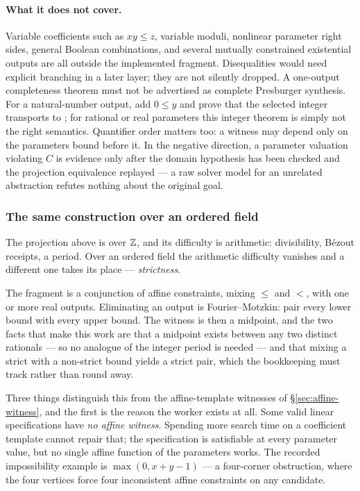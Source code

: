 \paragraph{What it does not cover.} Variable coefficients such as $xy\le z$,
variable moduli, nonlinear parameter right sides, general Boolean combinations,
and several mutually constrained existential outputs are all outside the
implemented fragment. Disequalities would need explicit branching in a later
layer; they are not silently dropped. A one-output completeness theorem must not
be advertised as complete Presburger synthesis. For a natural-number output,
add $0\le y$ and prove that the selected integer transports to ; for
rational or real parameters this integer theorem is simply not the right
semantics. Quantifier order matters too: a witness may depend only on the
parameters bound before it. In the negative direction, a parameter valuation
violating $C$ is evidence only after the domain hypothesis has been checked and
the projection equivalence replayed --- a raw solver model for an unrelated
abstraction refutes nothing about the original goal.

\subsubsection*{The same construction over an ordered field}

The projection above is over $\mathbb{Z}$, and its difficulty is arithmetic:
divisibility, B\'ezout receipts, a period. Over an ordered field the arithmetic
difficulty vanishes and a different one takes its place --- \emph{strictness}.

The fragment is a conjunction of affine constraints, mixing $\le$ and $<$, with
one or more real outputs. Eliminating an output is Fourier--Motzkin: pair every
lower bound with every upper bound. The witness is then a midpoint, and the two
facts that make this work are that a midpoint exists between any two distinct
rationals --- so no analogue of the integer period is needed --- and that
mixing a strict with a non-strict bound yields a strict pair, which the
bookkeeping must track rather than round away.

Three things distinguish this from the affine-template witnesses of
\S\ref{sec:affine-witness}, and the first is the reason the worker exists at
all. Some valid linear specifications have \emph{no affine witness}. Spending
more search time on a coefficient template cannot repair that; the specification
is satisfiable at every parameter value, but no single affine function of the
parameters works. The recorded impossibility example is
$\max(0,x+y-1)$ --- a four-corner obstruction, where the four vertices force
four inconsistent affine constraints on any candidate.

